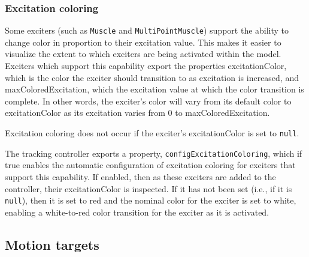 \subsubsection{Excitation coloring}
\label{ExcitationColoring:sec}

Some exciters (such as {\tt Muscle} and {\tt MultiPointMuscle}) support the
ability to change color in proportion to their excitation value. This makes it
easier to visualize the extent to which exciters are being activated within the
model. Exciters which support this capability export the properties {\sf
excitationColor}, which is the color the exciter should transition to as
excitation is increased, and {\sf maxColoredExcitation}, which the excitation
value at which the color transition is complete.  In other words, the exciter's
color will vary from its default color to {\sf excitationColor} as its excitation
varies from 0 to {\sf maxColoredExcitation}.

Excitation coloring does not occur if the exciter's {\sf excitationColor} is
set to {\tt null}.

The tracking controller exports a property, {\tt configExcitationColoring},
which if true enables the automatic configuration of excitation coloring for
exciters that support this capability. If enabled, then as these exciters are
added to the controller, their {\sf excitationColor} is inspected.  If it has
not been set (i.e., if it is {\tt null}), then it is set to red and the nominal
color for the exciter is set to white, enabling a white-to-red color transition
for the exciter as it is activated.

\subsection{Motion targets}
\label{MotionTargets:sec}

